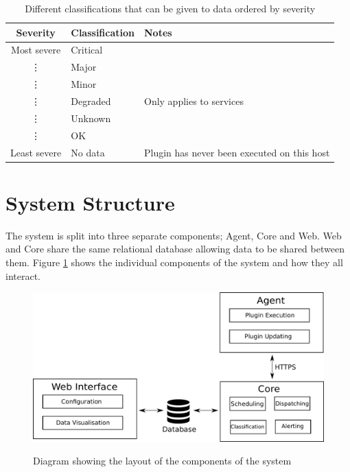 \documentclass[bsc,deptreport,twoside,parskip,singlespacing,notimes]{infthesis}
\begin{document}
\begin{table}[H]
	\centering
	\caption{Different classifications that can be given to data ordered by severity}
	\label{table-classifications}
    \begin{tabular}{|c|l|l|}
    \hline
    Severity     & Classification & Notes                                       \\ \hline
    Most severe  & Critical       & ~                                           \\
    \vdots       & Major          & ~                                           \\
    \vdots       & Minor          & ~                                           \\
    \vdots       & Degraded       & Only applies to services                    \\
    \vdots       & Unknown        & ~                                           \\
    \vdots       & OK             & ~                                           \\
    Least severe & No data        & Plugin has never been executed on this host \\ \hline
    \end{tabular}
\end{table}

\section{System Structure}

	The system is split into three separate components; Agent, Core and Web. Web
	and Core share the same relational database allowing data to be shared
	between them.  Figure \ref{system_structure} shows the individual components of
	the system and how they all interact.

\begin{figure}[H]
	\caption{Diagram showing the layout of the components of the system}
	\includegraphics[scale=0.5]{assets/system_structure.pdf}
	\label{system_structure}
\end{figure}
\end{document}
